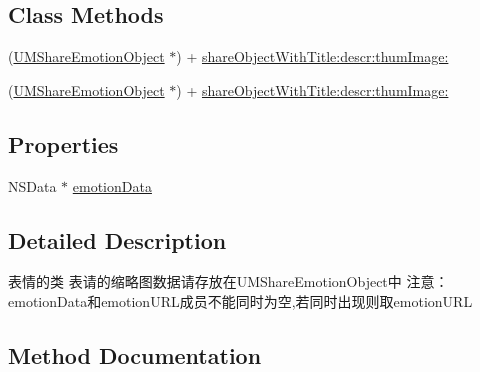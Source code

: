 \subsection*{Class Methods}
\begin{DoxyCompactItemize}
\item 
(\mbox{\hyperlink{interface_u_m_share_emotion_object}{U\+M\+Share\+Emotion\+Object}} $\ast$) + \mbox{\hyperlink{interface_u_m_share_emotion_object_a5a43d2ebd9a8648b36818e4c1858bed0}{share\+Object\+With\+Title\+:descr\+:thum\+Image\+:}}
\item 
(\mbox{\hyperlink{interface_u_m_share_emotion_object}{U\+M\+Share\+Emotion\+Object}} $\ast$) + \mbox{\hyperlink{interface_u_m_share_emotion_object_a5a43d2ebd9a8648b36818e4c1858bed0}{share\+Object\+With\+Title\+:descr\+:thum\+Image\+:}}
\end{DoxyCompactItemize}
\subsection*{Properties}
\begin{DoxyCompactItemize}
\item 
N\+S\+Data $\ast$ \mbox{\hyperlink{interface_u_m_share_emotion_object_afebd11e1d0aaac53e84628d5b72cff22}{emotion\+Data}}
\end{DoxyCompactItemize}


\subsection{Detailed Description}
表情的类 表请的缩略图数据请存放在\+U\+M\+Share\+Emotion\+Object中 注意：emotion\+Data和emotion\+U\+R\+L成员不能同时为空,若同时出现则取emotion\+U\+RL 

\subsection{Method Documentation}
\mbox{\label{interface_u_m_share_emotion_object_a5a43d2ebd9a8648b36818e4c1858bed0}} 

